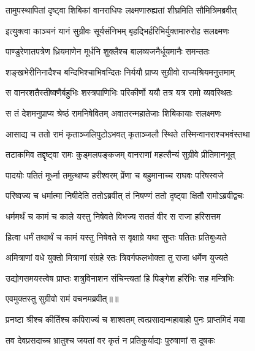 \twolineshloka
{तामुपस्थापितां दृष्ट्वा शिबिकां वानराधिपः}
{लक्ष्मणारुह्यतां शीघ्रमिति सौमित्रिमब्रवीत्} %

\twolineshloka
{इत्युक्त्वा काञ्चनं यानं सुग्रीवः सूर्यसंनिभम्}
{बृहद्भिर्हरिभिर्युक्तमारुरोह सलक्ष्मणः} %

\twolineshloka
{पाण्डुरेणातपत्रेण ध्रियमाणेन मूर्धनि}
{शुक्लैश्च बालव्यजनैर्धूयमानैः समन्ततः} %

\twolineshloka
{शङ्खभेरीनिनादैश्च बन्दिभिश्चाभिवन्दितः}
{निर्ययौ प्राप्य सुग्रीवो राज्यश्रियमनुत्तमाम्} %

\twolineshloka
{स वानरशतैस्तीष्क्णैर्बहुभिः शस्त्रपाणिभिः}
{परिकीर्णो ययौ तत्र यत्र रामो व्यवस्थितः} %

\twolineshloka
{स तं देशमनुप्राप्य श्रेष्ठं रामनिषेवितम्}
{अवातरन्महातेजाः शिबिकायाः सलक्ष्मणः} %

\twolineshloka
{आसाद्य च ततो रामं कृताञ्जलिपुटोऽभवत्}
{कृताञ्जलौ स्थिते तस्मिन्वानराश्चभवंस्तथा} %

\twolineshloka
{तटाकमिव तद्दृष्ट्वा रामः कुड्मलपङ्कजम्}
{वानराणां महत्सैन्यं सुग्रीवे प्रीतिमानभूत्} %

\twolineshloka
{पादयोः पतितं मूर्ध्ना तमुत्थाप्य हरीश्वरम्}
{प्रेंणा च बहुमानाच्च राघवः परिषस्वजे} %

\twolineshloka
{परिष्वज्य च धर्मात्मा निषीदेति ततोऽब्रवीत्}
{तं निषण्णं ततो दृष्ट्वा क्षितौ रामोऽब्रवीद्वचः} %

\twolineshloka
{धर्ममर्थं च कामं च काले यस्तु निषेवते}
{विभज्य सततं वीर स राजा हरिसत्तम} %

\twolineshloka
{हित्वा धर्मं तथार्थं च कामं यस्तु निषेवते}
{स वृक्षाग्रे यथा सुप्तः पतितः प्रतिबुध्यते} %

\twolineshloka
{अमित्राणां वधे युक्तो मित्राणां संग्रहे रतः}
{त्रिवर्गफलभोक्ता तु राजा धर्मेण युज्यते} %

\twolineshloka
{उद्योगसमयस्त्वेष प्राप्तः शत्रुविनाशन}
{संचिन्त्यतां हि पिङ्गेश हरिभिः सह मन्त्रिभिः} %

{एवमुक्तस्तु सुग्रीवो रामं वचनमब्रवीत्॥॥} %

\addtocounter{shlokacount}{1}

\twolineshloka
{प्रनष्टा श्रीश्च कीर्तिश्च कपिराज्यं च शाश्वतम्}
{त्वत्प्रसादान्महाबाहो पुनः प्राप्तमिदं मया} %

\twolineshloka
{तव देवप्रसदाच्च भ्रातुश्च जयतां वर}
{कृतं न प्रतिकुर्याद्यः पुरुषाणां स दूषकः} %

